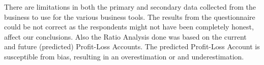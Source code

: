         
        
{There are limitations in both the primary and secondary data collected from the business to use for the various business tools. The results from the questionnaire could be not correct as the respondents might not have been completely honest, affect our conclusions. Also the Ratio Analysis done was based on the current and future (predicted) Profit-Loss Accounts. The predicted Profit-Loss Account is susceptible from bias, resulting in an overestimation or and underestimation.}        

{}



